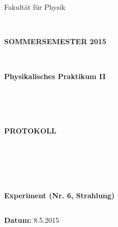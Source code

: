 \documentclass[12pt,a4paper,twopage]{article}
\begin{document}
\begin{verbatim}


\end{verbatim}
\begin{verbatim}


\end{verbatim}

\thispagestyle{empty}
			\begin{center}
			\Large{Fakultät für Physik}\\
			\end{center}
\begin{verbatim}


\end{verbatim}
			\begin{center}
			\textbf{\LARGE SOMMERSEMESTER 2015}
			\end{center}
\begin{verbatim}


\end{verbatim}
			\begin{center}
			\textbf{\LARGE{Physikalisches Praktikum II}}
			\end{center}
\begin{verbatim}




\end{verbatim}

			\begin{center}
			\textbf{\LARGE{PROTOKOLL}}
			\end{center}
			
\begin{verbatim}





\end{verbatim}

			\begin{flushleft}
			\textbf{\Large{Experiment (Nr. 6, Strahlung)}}\\
			\LARGE{}	
			\end{flushleft}

\begin{verbatim}

\end{verbatim}	
			\begin{flushleft}
			\textbf{\Large{Datum:}} \Large{8.5.2015}
			\end{flushleft}
			
\end{document}
